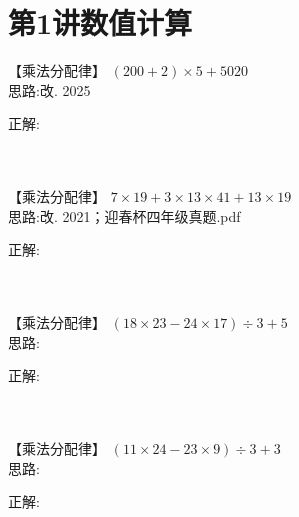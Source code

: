\section{第1讲\quad 数值计算}

\item {
    【乘法分配律】
    $(200+2)\times 5 + 5020$ 
    \ifshowSolution
        \fangsong{}
        \\
        思路:改. 2025

        正解: 
    \else
        \\ \\ \\
    \fi
}



\item {
    【乘法分配律】
    $7\times 19 + 3\times 13\times 41 + 13\times 19$
    \ifshowSolution
        \fangsong{}
        \\
        思路:改. 2021；迎春杯四年级真题.pdf

        正解: 
    \else
        \\ \\ \\
    \fi
}

\item {
    【乘法分配律】
    $(18\times 23 - 24\times 17)\div 3 + 5$
    \ifshowSolution
        \fangsong{}
        \\
        思路:

        正解: 
    \else
        \\ \\ \\
    \fi
}

\item {
    【乘法分配律】
    $(11\times 24 - 23\times 9)\div 3 + 3$
    \ifshowSolution
        \fangsong{}
        \\
        思路:

        正解: 
    \else
        \\ \\ \\
    \fi
}

